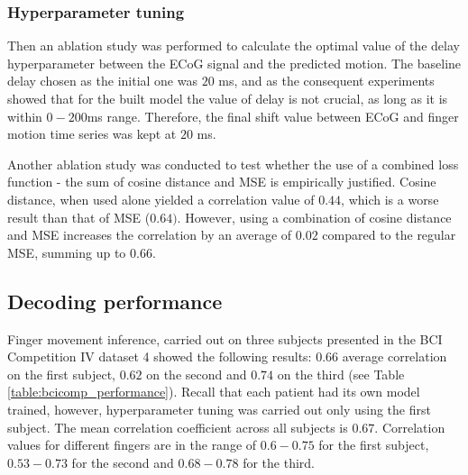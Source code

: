\documentclass[letterpaper]{article} \usepackage{aaai22}  \usepackage{times}  \usepackage{helvet}  \usepackage{courier}  \usepackage[hyphens]{url}  \usepackage{graphicx} \urlstyle{rm} \def\UrlFont{\rm}  \usepackage{natbib}  \usepackage{caption} \DeclareCaptionStyle{ruled}{labelfont=normalfont,labelsep=colon,strut=off} \frenchspacing  \setlength{\pdfpagewidth}{8.5in}  \setlength{\pdfpageheight}{11in}  \usepackage{algorithm}
\begin{document}
\subsubsection{Hyperparameter tuning}
Then an ablation study was performed to calculate the optimal value of the delay hyperparameter between the ECoG signal and the predicted motion. The baseline delay chosen as the initial one was $20$ ms, and as the consequent experiments showed that for the built model the value of delay is not crucial, as long as it is within $0-200$ms range. Therefore, the final shift value between ECoG and finger motion time series was kept at $20$ ms. 

Another ablation study was conducted to test whether the use of a combined loss function - the sum of cosine distance and MSE is empirically justified. Cosine distance, when used alone yielded a correlation value of $0.44$, which is a worse result than that of MSE ($0.64)$. However, using a combination of cosine distance and MSE increases the correlation by an average of $0.02$ compared to the regular MSE, summing up to 0.66. 

\subsection{Decoding performance}

Finger movement inference, carried out on three subjects presented in the BCI Competition IV dataset 4 showed the following results: $0.66$ average correlation on the first subject, $0.62$ on the second and $0.74$ on the third (see Table \ref{table:bcicomp_performance}). Recall that each patient had its own model trained, however, hyperparameter tuning was carried out only using the first subject. The mean correlation coefficient across all subjects is $0.67$. Correlation values for different fingers are in the range of $0.6-0.75$ for the first subject, $0.53-0.73$ for the second and $0.68-0.78$ for the third.
\end{document}
